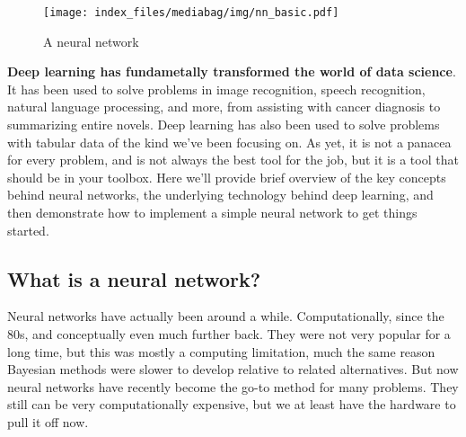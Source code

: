 \documentclass[
  letterpaper,
]{krantz}
\begin{document}
\begin{figure}[H]

{\centering \texttt{[image: index\_files/mediabag/img/nn\_basic.pdf]}

}

\caption{A neural network}

\end{figure}%

\textbf{Deep learning has fundametally transformed the world of data
science}. It has been used to solve problems in image recognition,
speech recognition, natural language processing, and more, from
assisting with cancer diagnosis to summarizing entire novels. Deep
learning has also been used to solve problems with tabular data of the
kind we've been focusing on. As yet, it is not a panacea for every
problem, and is not always the best tool for the job, but it is a tool
that should be in your toolbox. Here we'll provide brief overview of the
key concepts behind neural networks, the underlying technology behind
deep learning, and then demonstrate how to implement a simple neural
network to get things started.

\subsection{What is a neural network?}\label{sec-ml-nnet}

Neural networks have actually been around a while. Computationally,
since the 80s, and conceptually even much further back. They were not
very popular for a long time, but this was mostly a computing
limitation, much the same reason Bayesian methods were slower to develop
relative to related alternatives. But now neural networks have recently
become the go-to method for many problems. They still can be very
computationally expensive, but we at least have the hardware to pull it
off now.
\end{document}

